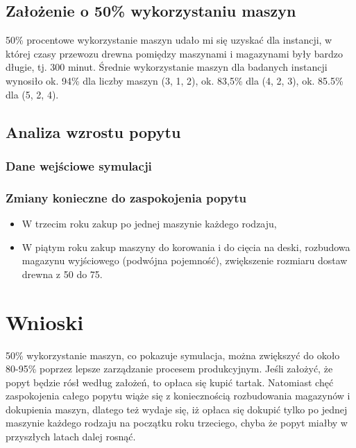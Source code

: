 \documentclass[a4paper]{article}
\begin{document}
\subsection{Założenie o 50\% wykorzystaniu maszyn}
50\% procentowe wykorzystanie maszyn udało mi się uzyskać dla instancji, w której czasy przewozu drewna pomiędzy maszynami i magazynami były bardzo długie, tj. 300 minut.
Średnie wykorzystanie maszyn dla badanych instancji wynosiło ok. 94\% dla liczby maszyn (3, 1, 2), ok. 83,5\% dla (4, 2, 3), ok. 85.5\% dla (5, 2, 4).
\subsection{Analiza wzrostu popytu}
\subsubsection{Dane wejściowe symulacji}

\subsubsection{Zmiany konieczne do zaspokojenia popytu}
\begin{itemize}
\item W trzecim roku zakup po jednej maszynie każdego rodzaju,
\item W piątym roku zakup maszyny do korowania i do cięcia na deski, rozbudowa magazynu wyjściowego (podwójna pojemność), zwiększenie rozmiaru dostaw drewna z 50 do 75.
\end{itemize}
\section{Wnioski}
50\% wykorzystanie maszyn, co pokazuje symulacja, można zwiększyć do około 80-95\% poprzez lepsze zarządzanie procesem produkcyjnym. Jeśli założyć, że popyt będzie rósł według założeń, to opłaca się kupić tartak. Natomiast chęć zaspokojenia całego popytu wiąże się z koniecznością rozbudowania magazynów i dokupienia maszyn, dlatego też wydaje się, iż opłaca się dokupić tylko po jednej maszynie każdego rodzaju na początku roku trzeciego, chyba że popyt miałby w przyszłych latach dalej rosnąć.
\end{document}
